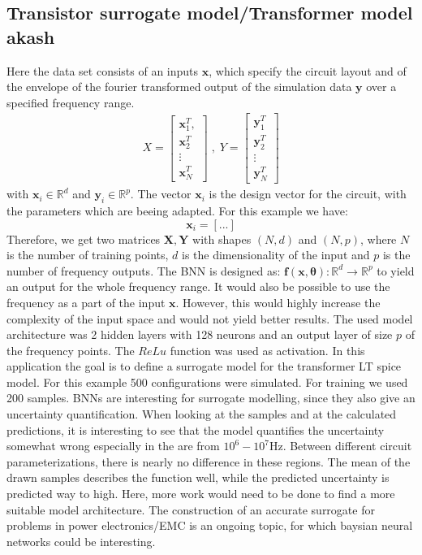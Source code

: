 \documentclass{article}
\begin{document}
\subsection{Transistor surrogate model/Transformer model akash}
Here the data set consists of an inputs $ \bm x$, which specify the circuit layout and of the envelope of the fourier transformed output of the simulation data $\bm y$ over a specified frequency range.
\begin{align}
    X = \begin{bmatrix}
        \bm x_1^T, \\
        \bm x_2^T\\
        \vdots\\
        \bm x_N^T
        \end{bmatrix} \;, \;
    Y = \begin{bmatrix}
        \bm y_1^T\\
        \bm y_2^T\\
        \vdots\\
        \bm y_N^T
    \end{bmatrix}
\end{align}
with $\bm x_i \in \mathbb{R}^d$ and $\bm y_i \in \mathbb{R}^{p}$. The vector $\bm x_i$ is the design vector for the circuit, with the parameters which are beeing adapted. For this example we have:
\begin{equation}
    \bm x_i = [...]
\end{equation}Therefore, we get two matrices $\bm X, \bm Y$ with shapes $(N, d)$ and $(N, p)$, where $N$ is the number of training points, $d$ is the dimensionality of the input and $p$ is the number of frequency outputs. The BNN is designed as: $\bm f(\bm x, \bm \theta): \mathbb{R}^d \rightarrow \mathbb{R}^p$ to yield an output for the whole frequency range. It would also be possible to use the frequency as a part of the input $\bm x$. However, this would highly increase the complexity of the input space and would not yield better results. The used model architecture was 2 hidden layers with 128 neurons and an output layer of size $p$ of the frequency points. The $ReLu$ function was used as activation. In this application the goal is to define a surrogate model for the transformer LT spice model. For this example 500 configurations were simulated. For training we used 200 samples. BNNs are interesting for surrogate modelling, since they also give an uncertainty quantification. When looking at the samples and at the calculated predictions, it is interesting to see that the model quantifies the uncertainty somewhat wrong especially in the are from $10^6 - 10^7 $Hz. Between different circuit parameterizations, there is nearly no difference in these regions. The mean of the drawn samples describes the function well, while the predicted uncertainty is predicted way to high. Here, more work would need to be done to find a more suitable model architecture. The construction of an accurate surrogate for problems in power electronics/EMC is an ongoing topic, for which baysian neural networks could be interesting.
\end{document}
